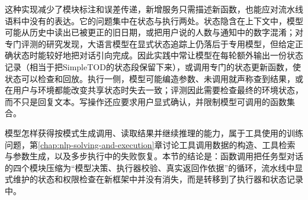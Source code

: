 这种实现减少了模块标注和误差传递，新增服务只需描述新函数，也能应对流水线语料中没有的表达。它的问题集中在状态与执行两处。状态隐含在上下文中，模型可能从历史中读出已被更正的旧日期，或把用户说的人数与通知中的数字混淆；对专门评测的研究发现，大语言模型在显式状态追踪上仍落后于专用模型，但给定正确状态时能较好地把对话引向完成。因此实践中常让模型在每轮额外输出一份状态记录（相当于把SimpleTOD的状态段保留下来），或调用专门的状态更新函数，使状态可以检查和回放。执行一侧，模型可能编造参数、未调用就声称查到结果，或在用户与环境都能改变共享状态时失去一致；评测因此需要检查最终的环境状态，而不只是回复文本。写操作还应要求用户显式确认，并限制模型可调用的函数集合。

模型怎样获得按模式生成调用、读取结果并继续推理的能力，属于工具使用的训练问题，第\ref{chap:nlp-solving-and-execution}章讨论工具调用数据的构造、工具检索与参数生成，以及多步执行中的失败恢复。本节的结论是：函数调用把任务型对话的四个模块压缩为“模型决策、执行器校验、真实返回作依据”的循环，流水线中显式维护的状态和权限检查在新框架中并没有消失，而是转移到了执行器和状态记录中。
